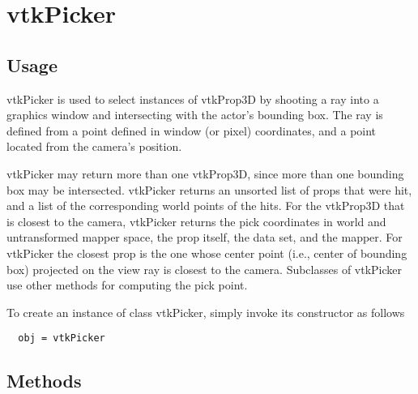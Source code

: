 \section{vtkPicker}

\subsection{Usage}

 vtkPicker is used to select instances of vtkProp3D by shooting a ray 
 into a graphics window and intersecting with the actor's bounding box. 
 The ray is defined from a point defined in window (or pixel) coordinates, 
 and a point located from the camera's position.

 vtkPicker may return more than one vtkProp3D, since more than one bounding 
 box may be intersected. vtkPicker returns an unsorted list of props that
 were hit, and a list of the corresponding world points of the hits.
 For the vtkProp3D that is closest to the camera, vtkPicker returns the
 pick coordinates in world and untransformed mapper space, the prop itself,
 the data set, and the mapper.  For vtkPicker the closest prop is the one
 whose center point (i.e., center of bounding box) projected on the view
 ray is closest to the camera.  Subclasses of vtkPicker use other methods
 for computing the pick point.

To create an instance of class vtkPicker, simply
invoke its constructor as follows
\begin{verbatim}
  obj = vtkPicker
\end{verbatim}
\subsection{Methods}

